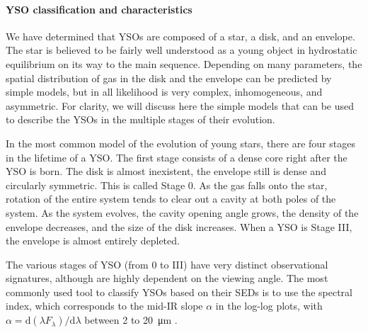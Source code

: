 



\paragraph{YSO classification and characteristics}

We have determined that YSOs are composed of a star, a disk, and an envelope. The star is believed to be fairly well understood as a young object in hydrostatic equilibrium on its way to the main sequence. Depending on many parameters, the spatial distribution of gas in the disk and the envelope can be predicted by simple models, but in all likelihood is very complex, inhomogeneous, and asymmetric. 
For clarity, we will discuss here the simple models that can be used to describe the YSOs in the multiple stages of their evolution.

In the most common model of the evolution of young stars, there are four stages in the lifetime of a YSO. The first stage consists of a dense core right after the YSO is born. The disk is almost inexistent, the envelope still is dense and circularly symmetric. This is called Stage 0. As the gas falls onto the star, rotation of the entire system tends to clear out a cavity at both poles of the system. As the system evolves, the cavity opening angle grows, the density of the envelope decreases, and the size of the disk increases. When a YSO is Stage III, the envelope is almost entirely depleted.

The various stages of YSO (from 0 to III) have very distinct observational signatures, although are highly dependent on the viewing angle. The most commonly used tool to classify YSOs based on their SEDs is to use the spectral index, which corresponds to the mid-IR slope $\alpha$ in the log-log plots, with $\alpha = \textrm{d}(\lambda F_\lambda)/\textrm{d}\lambda$ between 2 to \SI{20}{\micro\meter} \citep{McKee:2007bd}.


